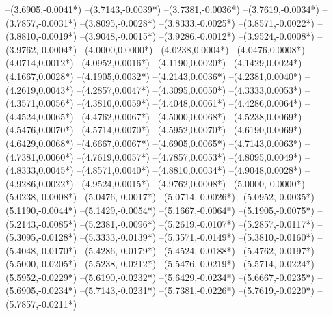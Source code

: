 {	--(3.6905,{-0.0041*\yskala})
	--(3.7143,{-0.0039*\yskala})
	--(3.7381,{-0.0036*\yskala})
	--(3.7619,{-0.0034*\yskala})
	--(3.7857,{-0.0031*\yskala})
	--(3.8095,{-0.0028*\yskala})
	--(3.8333,{-0.0025*\yskala})
	--(3.8571,{-0.0022*\yskala})
	--(3.8810,{-0.0019*\yskala})
	--(3.9048,{-0.0015*\yskala})
	--(3.9286,{-0.0012*\yskala})
	--(3.9524,{-0.0008*\yskala})
	--(3.9762,{-0.0004*\yskala})
	--(4.0000,{0.0000*\yskala})
	--(4.0238,{0.0004*\yskala})
	--(4.0476,{0.0008*\yskala})
	--(4.0714,{0.0012*\yskala})
	--(4.0952,{0.0016*\yskala})
	--(4.1190,{0.0020*\yskala})
	--(4.1429,{0.0024*\yskala})
	--(4.1667,{0.0028*\yskala})
	--(4.1905,{0.0032*\yskala})
	--(4.2143,{0.0036*\yskala})
	--(4.2381,{0.0040*\yskala})
	--(4.2619,{0.0043*\yskala})
	--(4.2857,{0.0047*\yskala})
	--(4.3095,{0.0050*\yskala})
	--(4.3333,{0.0053*\yskala})
	--(4.3571,{0.0056*\yskala})
	--(4.3810,{0.0059*\yskala})
	--(4.4048,{0.0061*\yskala})
	--(4.4286,{0.0064*\yskala})
	--(4.4524,{0.0065*\yskala})
	--(4.4762,{0.0067*\yskala})
	--(4.5000,{0.0068*\yskala})
	--(4.5238,{0.0069*\yskala})
	--(4.5476,{0.0070*\yskala})
	--(4.5714,{0.0070*\yskala})
	--(4.5952,{0.0070*\yskala})
	--(4.6190,{0.0069*\yskala})
	--(4.6429,{0.0068*\yskala})
	--(4.6667,{0.0067*\yskala})
	--(4.6905,{0.0065*\yskala})
	--(4.7143,{0.0063*\yskala})
	--(4.7381,{0.0060*\yskala})
	--(4.7619,{0.0057*\yskala})
	--(4.7857,{0.0053*\yskala})
	--(4.8095,{0.0049*\yskala})
	--(4.8333,{0.0045*\yskala})
	--(4.8571,{0.0040*\yskala})
	--(4.8810,{0.0034*\yskala})
	--(4.9048,{0.0028*\yskala})
	--(4.9286,{0.0022*\yskala})
	--(4.9524,{0.0015*\yskala})
	--(4.9762,{0.0008*\yskala})
	--(5.0000,{-0.0000*\yskala})
	--(5.0238,{-0.0008*\yskala})
	--(5.0476,{-0.0017*\yskala})
	--(5.0714,{-0.0026*\yskala})
	--(5.0952,{-0.0035*\yskala})
	--(5.1190,{-0.0044*\yskala})
	--(5.1429,{-0.0054*\yskala})
	--(5.1667,{-0.0064*\yskala})
	--(5.1905,{-0.0075*\yskala})
	--(5.2143,{-0.0085*\yskala})
	--(5.2381,{-0.0096*\yskala})
	--(5.2619,{-0.0107*\yskala})
	--(5.2857,{-0.0117*\yskala})
	--(5.3095,{-0.0128*\yskala})
	--(5.3333,{-0.0139*\yskala})
	--(5.3571,{-0.0149*\yskala})
	--(5.3810,{-0.0160*\yskala})
	--(5.4048,{-0.0170*\yskala})
	--(5.4286,{-0.0179*\yskala})
	--(5.4524,{-0.0188*\yskala})
	--(5.4762,{-0.0197*\yskala})
	--(5.5000,{-0.0205*\yskala})
	--(5.5238,{-0.0212*\yskala})
	--(5.5476,{-0.0219*\yskala})
	--(5.5714,{-0.0224*\yskala})
	--(5.5952,{-0.0229*\yskala})
	--(5.6190,{-0.0232*\yskala})
	--(5.6429,{-0.0234*\yskala})
	--(5.6667,{-0.0235*\yskala})
	--(5.6905,{-0.0234*\yskala})
	--(5.7143,{-0.0231*\yskala})
	--(5.7381,{-0.0226*\yskala})
	--(5.7619,{-0.0220*\yskala})
	--(5.7857,{-0.0211*\yskala})
}
